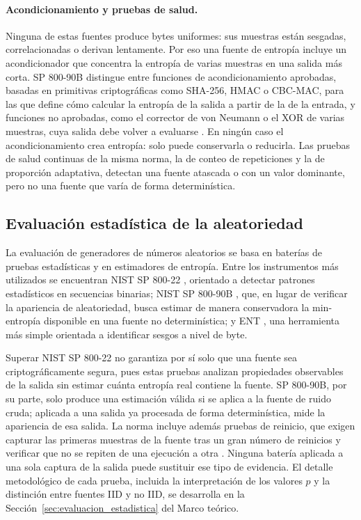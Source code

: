 \paragraph{Acondicionamiento y pruebas de salud.} Ninguna de estas fuentes produce bytes uniformes: sus muestras están sesgadas, correlacionadas o derivan lentamente. Por eso una fuente de entropía incluye un acondicionador que concentra la entropía de varias muestras en una salida más corta. SP 800-90B distingue entre funciones de acondicionamiento aprobadas, basadas en primitivas criptográficas como SHA-256, HMAC o CBC-MAC, para las que define cómo calcular la entropía de la salida a partir de la de la entrada, y funciones no aprobadas, como el corrector de von Neumann o el XOR de varias muestras, cuya salida debe volver a evaluarse \cite{Turan2018RecommendationGeneration}. En ningún caso el acondicionamiento crea entropía: solo puede conservarla o reducirla. Las pruebas de salud continuas de la misma norma, la de conteo de repeticiones y la de proporción adaptativa, detectan una fuente atascada o con un valor dominante, pero no una fuente que varía de forma determinística.

\subsection{Evaluación estadística de la aleatoriedad}

La evaluación de generadores de números aleatorios se basa en baterías de pruebas estadísticas y en estimadores de entropía. Entre los instrumentos más utilizados se encuentran NIST SP 800-22 \cite{Rukhin2010AApplications}, orientado a detectar patrones estadísticos en secuencias binarias; NIST SP 800-90B \cite{Turan2018RecommendationGeneration}, que, en lugar de verificar la apariencia de aleatoriedad, busca estimar de manera conservadora la min-entropía disponible en una fuente no determinística; y ENT \cite{Walker2008ENT:Program}, una herramienta más simple orientada a identificar sesgos a nivel de byte.

Superar NIST SP 800-22 no garantiza por sí solo que una fuente sea criptográficamente segura, pues estas pruebas analizan propiedades observables de la salida sin estimar cuánta entropía real contiene la fuente. SP 800-90B, por su parte, solo produce una estimación válida si se aplica a la fuente de ruido cruda; aplicada a una salida ya procesada de forma determinística, mide la apariencia de esa salida. La norma incluye además pruebas de reinicio, que exigen capturar las primeras muestras de la fuente tras un gran número de reinicios y verificar que no se repiten de una ejecución a otra \cite{Turan2018RecommendationGeneration}. Ninguna batería aplicada a una sola captura de la salida puede sustituir ese tipo de evidencia. El detalle metodológico de cada prueba, incluida la interpretación de los valores $p$ y la distinción entre fuentes IID y no IID, se desarrolla en la Sección~\ref{sec:evaluacion_estadistica} del Marco teórico.

